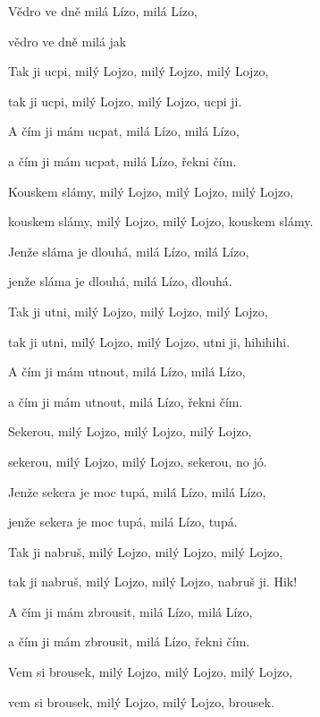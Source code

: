 







\zs
Vědro  ve dně  milá Lízo, milá Lízo,

vědro  ve dně  milá  jak 
\ks

\zs
Tak ji ucpi, milý Lojzo, milý Lojzo, milý Lojzo,

tak ji ucpi, milý Lojzo, milý Lojzo, ucpi ji.
\ks

\zs
A čím ji mám ucpat, milá Lízo, milá Lízo,

a čím ji mám ucpat, milá Lízo, řekni čím.
\ks

\zs
Kouskem slámy, milý Lojzo, milý Lojzo, milý Lojzo,

kouskem slámy, milý Lojzo, milý Lojzo, kouskem slámy.
\ks

\zs
Jenže sláma je dlouhá, milá Lízo, milá Lízo,

jenže sláma je dlouhá, milá Lízo, dlouhá.
\ks

\zs
Tak ji utni, milý Lojzo, milý Lojzo, milý Lojzo,

tak ji utni, milý Lojzo, milý Lojzo, utni ji, hihihihi.
\ks

\zs
A čím ji mám utnout, milá Lízo, milá Lízo,

a čím ji mám utnout, milá Lízo, řekni čím.
\ks

\zs
Sekerou, milý Lojzo, milý Lojzo, milý Lojzo,

sekerou, milý Lojzo, milý Lojzo, sekerou, no jó.
\ks

\zs
Jenže sekera je moc tupá, milá Lízo, milá Lízo,

jenže sekera je moc tupá, milá Lízo, tupá.
\ks

\zs
Tak ji nabruš, milý Lojzo, milý Lojzo, milý Lojzo,

tak ji nabruš, milý Lojzo, milý Lojzo, nabruš ji. Hik!
\ks

\zs
A čím ji mám zbrousit, milá Lízo, milá Lízo,

a čím ji mám zbrousit, milá Lízo, řekni čím.
\ks

\zs
Vem si brousek, milý Lojzo, milý Lojzo, milý Lojzo,

vem si brousek, milý Lojzo, milý Lojzo, brousek.
\ks

